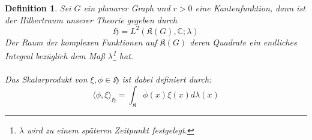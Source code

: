 \documentclass[11pt,a4paper,leqno]{report}
\newtheorem{definition}[theorem]{Definition}
\numberwithin{equation}{chapter}
\begin{document}
\begin{definition}
	Sei $G$ ein planarer Graph und $r>0$ eine Kantenfunktion, dann ist der Hilbertraum unserer Theorie gegeben durch
	\begin{equation}
		\mathfrak{H} = L^2(\mathfrak{K}(G),\mathbb{C};\lambda)
	\end{equation}
	Der Raum der komplexen Funktionen auf $\mathfrak{K}(G)$ deren Quadrate ein endliches Integral bez\"uglich dem Ma\ss{} $\lambda$\footnote{$\lambda$ wird zu einem sp\"ateren Zeitpunkt festgelegt.} hat.\\
	\\
	Das Skalarprodukt von $\xi,\phi\in\mathfrak{H}$ ist dabei definiert durch:
	\begin{equation}
		\langle \phi, \xi\rangle_{\mathfrak{H}} = \int_\mathfrak{K} \overline{\phi}(x)\xi(x)d\lambda(x)
	\end{equation}
\end{definition}
\noindent
\end{document}
